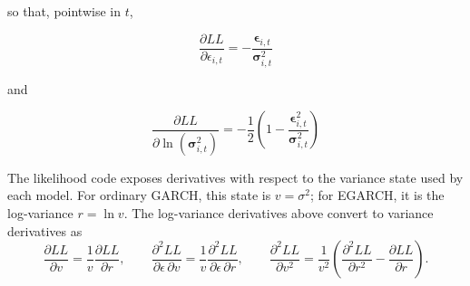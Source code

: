 \documentclass[12pt]{article}
\begin{document}
so that, pointwise in $t$,

\begin{equation}
\frac{\partial LL}{\partial\epsilon_{i,t}} = - \frac{{\mathbf{\epsilon}_{i,t}}}{\mathbf{\sigma}_{i,t}^{2}}
\label{eq:55}
\end{equation}

and

\begin{equation}
\frac{\partial LL}{\partial\ln\left(\mathbf{\sigma}_{i,t}^{2}\right)} = - \frac{1}{2}\left(1-\frac{{\mathbf{\epsilon}_{i,t}^{2}}}{\mathbf{\sigma}_{i,t}^{2}}\right)
\label{eq:56}
\end{equation}

The likelihood code exposes derivatives with respect to the variance state used by each model. For ordinary GARCH, this state is $v=\sigma^{2}$; for EGARCH, it is the log-variance $r=\ln v$. The log-variance derivatives above convert to variance derivatives as
\begin{equation}
\frac{\partial LL}{\partial v}=\frac{1}{v}\frac{\partial LL}{\partial r},\qquad
\frac{\partial^{2}LL}{\partial\epsilon\,\partial v}=\frac{1}{v}\frac{\partial^{2}LL}{\partial\epsilon\,\partial r},\qquad
\frac{\partial^{2}LL}{\partial v^{2}}=\frac{1}{v^{2}}\left(\frac{\partial^{2}LL}{\partial r^{2}}-\frac{\partial LL}{\partial r}\right).
\label{eq:variance-logvariance-chain}
\end{equation}
\end{document}
